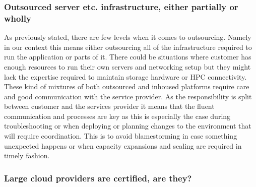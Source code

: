 \documentclass{article}
\begin{document}
\subsubsection{Outsourced server etc. infrastructure, either partially or wholly}
As previously stated, there are few levels when it comes to outsourcing. Namely in our context this means either outsourcing all of the infrastructure required to run the application or parts of it. There could be situations where customer has enough resources to run their own servers and networking setup but they might lack the expertise required to maintain storage hardware or HPC connectivity.
These kind of mixtures of both outsourced and inhoused platforms require care and good communication with the service provider. As the responsibility is split between customer and the services provider it means that the fluent communication and processes are key as this is especially the case during troubleshooting or when deploying or planning changes to the environment that will require coordination. This is to avoid blamestorming in case something unexpected happens or when capacity expansions and scaling are required in timely fashion.
\subsubsection{Large cloud providers are certified, are they?}
\end{document}
